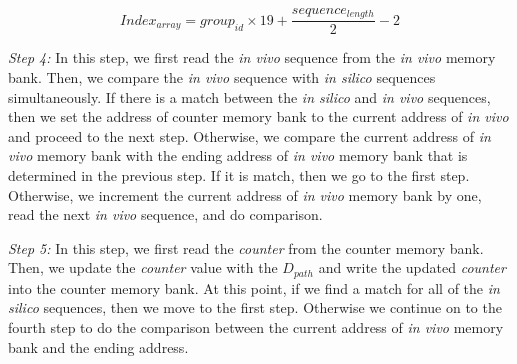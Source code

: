 \begin{equation}\label{eq:5}	
Index_{array} = group_{id} \times 19 + \frac{sequence_{length}} {2} - 2
\end{equation} 

\emph{Step 4:} In this step, we first read the \emph{in vivo} sequence from the \emph{in vivo} memory bank. Then, we compare the  \emph{in vivo} sequence with  \emph{in silico} sequences  simultaneously. If there is a match between the \emph{in silico} and \emph{in vivo} sequences, then we set the address of counter memory bank to the current address of \emph{in vivo} and proceed to the next step. Otherwise, we compare the current address of \emph{in vivo} memory bank with the ending address of \emph{in vivo} memory bank that is determined in the previous step. If it is match, then we go to the first step. Otherwise, we increment the current address  of \emph{in vivo} memory bank by one, read the next \emph{in vivo} sequence, and do comparison.

\emph{Step 5:} In this step, we first read the \emph{counter} from the counter memory bank. Then, we update the \emph{counter} value with the $D_{path}$ and write the updated \emph{counter}  into the counter memory bank. At this point, if we find a match for all of the \emph{in silico} sequences,  then we move to the first step. Otherwise we continue on to the fourth step to do the comparison between the current address of \emph{in vivo} memory bank and the ending address.

